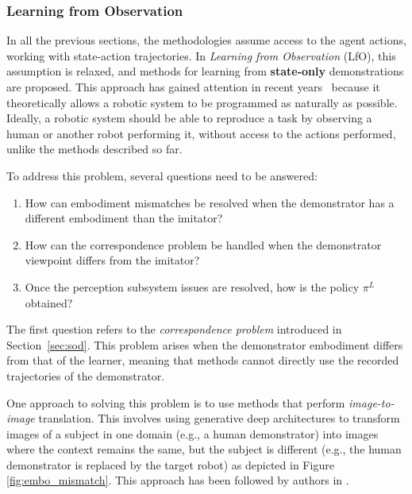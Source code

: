 \subsubsection{Learning from Observation}


\label{sec:lfo}
In all the previous sections, the methodologies assume access to the agent actions, working with state-action trajectories. In \textit{Learning from Observation} (LfO), this assumption is relaxed, and methods for learning from \textbf{state-only} demonstrations are proposed. This approach has gained attention in recent years~\cite{torabi2019recent_advances_lfo} because it theoretically allows a robotic system to be programmed as naturally as possible. Ideally, a robotic system should be able to reproduce a task by observing a human or another robot performing it, without access to the actions performed, unlike the methods described so far.

To address this problem, several questions need to be answered:

\begin{enumerate}
\item How can embodiment mismatches be resolved when the demonstrator has a different embodiment than the imitator?
\item How can the correspondence problem be handled when the demonstrator viewpoint differs from the imitator?
\item Once the perception subsystem issues are resolved, how is the policy $\pi^{L}$ obtained?
\end{enumerate}

The first question refers to the \textit{correspondence problem} introduced in Section~\ref{sec:sod}. This problem arises when the demonstrator embodiment differs from that of the learner, meaning that methods cannot directly use the recorded trajectories of the demonstrator.

One approach to solving this problem is to use methods that perform \textit{image-to-image} translation. This involves using generative deep architectures to transform images of a subject in one domain (e.g., a human demonstrator) into images where the context remains the same, but the subject is different (e.g., the human demonstrator is replaced by the target robot) as depicted in Figure \ref{fig:embo_mismatch}. This approach has been followed by authors in \cite{smith2019avid,xiong2021learning_by_watching,li2021meta_watching_video_demonstration}.

